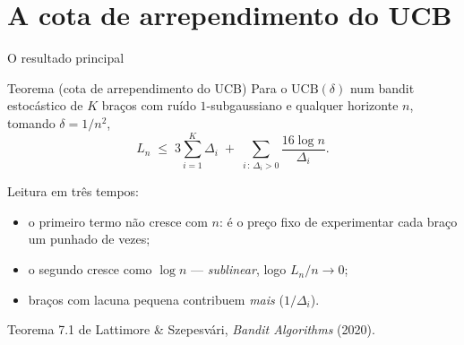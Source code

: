 \documentclass[aspectratio=169, 11pt]{beamer}
\newcommand{\ucb}{\mathrm{UCB}}
\begin{document}
\section{A cota de arrependimento do UCB}

\begin{frame}{O resultado principal}
  \begin{teobox}{Teorema (cota de arrependimento do UCB)}
    Para o $\ucb(\delta)$ num bandit estocástico de $K$ braços com ruído
    $1$-subgaussiano e qualquer horizonte $n$, tomando $\delta = 1/n^{2}$,
    \[
      L_n \;\le\; 3\sum_{i=1}^{K}\Delta_i
        \;+\; \sum_{i\,:\,\Delta_i>0}\frac{16\log n}{\Delta_i}.
    \]
  \end{teobox}

  {\small Leitura em três tempos:
  \begin{itemize}\setlength{\itemsep}{0.2ex}
    \item o primeiro termo \alert{não cresce com $n$}: é o preço fixo de
          experimentar cada braço um punhado de vezes;
    \item o segundo cresce como $\log n$ --- \emph{sublinear}, logo
          $L_n/n\to 0$;
    \item braços com lacuna pequena contribuem \emph{mais} ($1/\Delta_i$).
  \end{itemize}}

  \vspace{-0.3em}
  {\footnotesize\color{rlCinza} Teorema 7.1 de Lattimore \& Szepesvári,
  \emph{Bandit Algorithms} (2020).}
\end{frame}
\end{document}
